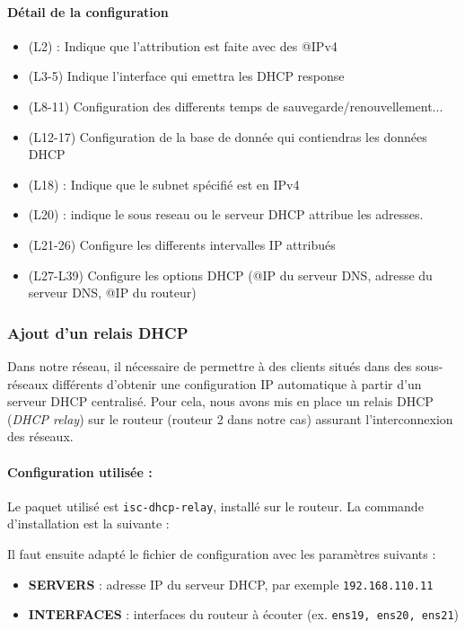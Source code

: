 \documentclass{article}
\begin{document}
\paragraph{Détail de la configuration}
\begin{itemize}
	\item (L2)  : Indique que l'attribution est faite avec des @IPv4
	\item (L3-5) Indique l'interface qui emettra les DHCP response
	\item (L8-11) Configuration des differents temps de sauvegarde/renouvellement...
	\item (L12-17) Configuration de la base de donnée qui contiendras les données DHCP
	\item (L18)  : Indique que le subnet spécifié est en IPv4
	\item (L20)  : indique le sous reseau ou le serveur DHCP attribue les adresses.
	\item (L21-26) Configure les differents intervalles IP attribués
	\item (L27-L39) Configure les options DHCP (@IP du serveur DNS, adresse du serveur DNS, @IP du routeur)
\end{itemize}

\subsubsection{Ajout d'un relais DHCP}

Dans notre réseau, il nécessaire de permettre à des clients situés dans des sous-réseaux différents d'obtenir une configuration IP automatique à partir d’un serveur DHCP centralisé. Pour cela, nous avons mis en place un relais DHCP (\textit{DHCP relay}) sur le routeur (routeur 2 dans notre cas) assurant l’interconnexion des réseaux.

\paragraph{Configuration utilisée :}
Le paquet utilisé est \texttt{isc-dhcp-relay}, installé sur le routeur. La commande d’installation est la suivante :


Il faut ensuite adapté le fichier de configuration  avec les paramètres suivants :

\begin{itemize}
  \item \textbf{SERVERS} : adresse IP du serveur DHCP, par exemple \texttt{192.168.110.11}
  \item \textbf{INTERFACES} : interfaces du routeur à écouter (ex. \texttt{ens19, ens20, ens21})
\end{itemize}
\end{document}
